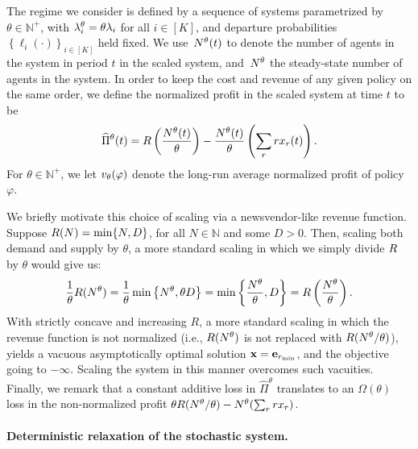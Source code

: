 \documentclass[12pt]{article}
\begin{document}
The regime we consider is defined by a sequence of systems parametrized by $\theta \in \mathbb{N}^+$, with $\lambda^\theta_i = \theta\lambda_i$ for all $i \in [K]$, and departure probabilities $\left\{\ell_i(\cdot)\right\}_{i\in[K]}$ held fixed. 
We use~$N^\theta(t)$ to denote the number of agents in the system in period $t$ in the scaled system, and~$N^\theta$ the steady-state number of agents in the system. In order to keep the cost and revenue of any given policy on the same order, we define the 
{normalized profit in the scaled system} %
at time $t$ to be
\begin{align*}
\widehat{\Pi}^\theta(t) = R\left(\frac{N^\theta(t)}{\theta}\right)-\frac{N^\theta(t)}{\theta}\left(\sum_r r x_r(t)\right).
\end{align*}
For $\theta \in \mathbb{N}^+$, we let $v_{\theta}(\varphi)$ denote the long-run average {normalized} %
profit of policy $\varphi$. %

{We briefly motivate this choice of scaling via a newsvendor-like revenue function. Suppose $R(N) = \min\{N,D\}$, for all $N \in \mathbb{N}$ and some $D > 0$. Then, scaling both demand and supply by $\theta$, %
a more standard scaling in which we simply divide $R$ by $\theta$ would give us:
\begin{align*}
    \frac1\theta R(N^\theta) = \frac1\theta \min\left\{N^\theta, \theta D\right\} = \min\left\{\frac{N^\theta}{\theta}, D\right\} = R\left(\frac{N^\theta}{\theta}\right).
\end{align*}
}
With strictly concave and increasing $R$, {a more standard scaling in which the revenue function is {not normalized} %
(i.e., $R{(N^\theta)}$ is not replaced with $R(N^\theta/\theta)$), yields a vacuous asymptotically optimal solution $\mathbf{x}=\mathbf{e}_{r_{\min}}$, and the objective going to $-\infty$. Scaling the system in this manner overcomes such vacuities.} Finally, we remark that a constant additive loss in $\widehat{\Pi}^\theta$ translates to an $\Omega(\theta)$ loss in the non-normalized profit $\theta R(N^\theta/\theta)-N^\theta(\sum_r rx_r)$.







\paragraph{Deterministic relaxation of the stochastic system.} 
\end{document}
